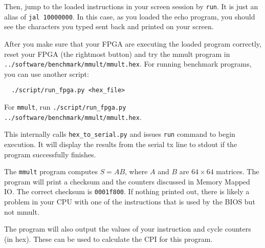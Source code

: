 Then, jump to the loaded instructions in your screen session by \verb|run|.
It is just an alias of \verb|jal 10000000|.
In this case, as you loaded the echo program, you should see the characters you typed
sent back and printed on your screen.

After you make sure that your FPGA are executing the loaded program correctly,
reset your FPGA (the rightmost button) and try the mmult program
in \verb|../software/benchmark/mmult/mmult.hex|.
For running benchmark programs, you can use another script:
\begin{verbatim}
  ./script/run_fpga.py <hex_file>
\end{verbatim}
For \verb|mmult|, run \verb|./script/run_fpga.py ../software/benchmark/mmult/mmult.hex|.

This internally calls \verb|hex_to_serial.py| and issues \verb|run| command to begin execution.
It will display the results from the serial tx line to stdout if the program successfully finishes.

The \verb|mmult| program computes $S=AB$, where $A$ and $B$ are $64 \times 64$ matrices.
The program will print a checksum and the counters discussed in Memory Mapped IO.
The correct checksum is \verb|0001f800|.
If nothing printed out, there is likely a problem in your CPU with one of the instructions that is used by the BIOS but not mmult.

The program will also output the values of your instruction and cycle counters (in hex).
These can be used to calculate the CPI for this program.


\newpage
